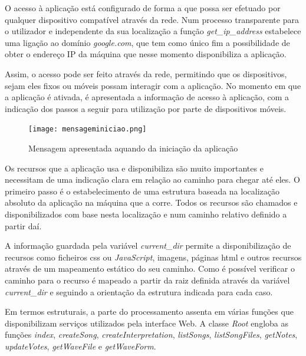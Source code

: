 \documentclass[11pt,openany,twoside]{report}
\begin{document}
O acesso à aplicação está configurado de forma a que possa ser efetuado por qualquer dispositivo compatível através da rede. Num processo transparente para o utilizador e independente da sua localização a função \textit{get\_ip\_address} estabelece uma ligação ao domínio \textit{google.com}, que tem como único fim a possibilidade de obter o endereço IP da máquina que nesse momento disponibiliza a aplicação.


Assim, o acesso pode ser feito através da rede, permitindo que os dispositivos, sejam eles fixos ou móveis possam interagir com a aplicação. No momento em que a aplicação é ativada, é apresentada a informação de acesso à aplicação, com a indicação dos passos a seguir para utilização por parte de dispositivos móveis. 
\begin{figure}
 \center
 \texttt{[image: mensageminiciao.png]}
 \caption{Mensagem apresentada aquando da iniciação da aplicação}
 \label{mensageminiciao}
\end{figure}

Os recursos que a aplicação usa e disponibiliza são muito importantes e necessitam de uma indicação clara em relação ao caminho para chegar até eles. O primeiro passo é o estabelecimento de uma estrutura baseada na localização absoluto da aplicação na máquina que a corre. Todos os recursos são chamados e disponibilizados com base nesta localização e num caminho relativo definido a partir daí. 

A informação guardada pela variável \textit{current\_dir} permite a disponibilização de recursos como ficheiros \acs{css} ou \textit{JavaScript}, imagens, páginas \ac{html} e outros recursos através de um mapeamento estático do seu caminho. Como é possível verificar o caminho para o recurso é mapeado a partir da raiz definida através da variável \textit{current\_dir} e seguindo a orientação da estrutura indicada para cada caso.

Em termos estruturais, a parte do processamento assenta em várias funções que disponibilizam serviços utilizados pela interface Web. A classe \textit{Root} engloba as funções \textit{index}, \textit{createSong}, \textit{createInterpretation}, \textit{listSongs}, \textit{listSongFiles}, \textit{getNotes}, \textit{updateVotes}, \textit{getWaveFile} e \textit{getWaveForm}.
\end{document}
